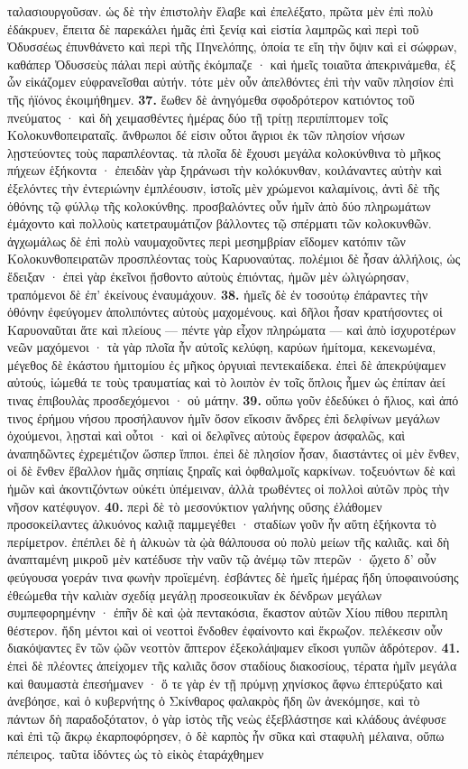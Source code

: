 \documentclass[a4paper, 11pt, oneside, polutonikogreek, german]{article}
\begin{document}
ταλασιουργοῦσαν. ὡς δὲ τὴν ἐπιστολὴν ἔλαβε καὶ ἐπελέξατο, πρῶτα μὲν ἐπὶ πολὺ ἐδάκρυεν, ἔπειτα δὲ παρεκάλει ἡμᾶς ἐπὶ ξενίᾳ καὶ εἱστία λαμπρῶς καὶ περὶ τοῦ Ὀδυσσέως ἐπυνθάνετο καὶ περὶ τῆς Πηνελόπης, ὁποία τε εἴη τὴν ὄψιν καὶ εἰ σώφρων, καθάπερ Ὀδυσσεὺς πάλαι περὶ αὐτῆς ἐκόμπαζε · καὶ ἡμεῖς τοιαῦτα ἀπεκρινάμεθα, ἐξ ὧν εἰκάζομεν εὐφρανεῖσθαι αὐτήν. τότε μὲν οὖν ἀπελθόντες ἐπὶ τὴν ναῦν πλησίον ἐπὶ τῆς ἠϊόνος ἐκοιμήθημεν. \textbf{37.} ἕωθεν δὲ ἀνηγόμεθα σφοδρότερον κατιόντος τοῦ πνεύματος · καὶ δὴ χειμασθέντες ἡμέρας δύο τῇ τρίτῃ περιπίπτομεν τοῖς Κολοκυνθοπειραταῖς. ἄνθρωποι δέ εἰσιν οὗτοι ἄγριοι ἐκ τῶν πλησίον νήσων λῃστεύοντες τοὺς παραπλέοντας. τὰ πλοῖα δὲ ἔχουσι μεγάλα κολοκύνθινα τὸ μῆκος πήχεων ἑξήκοντα · ἐπειδὰν γὰρ ξηράνωσι τὴν κολόκυνθαν, κοιλάναντες αὐτὴν καὶ ἐξελόντες τὴν ἐντεριώνην ἐμπλέουσιν, ἱστοῖς μὲν χρώμενοι καλαμίνοις, ἀντὶ δὲ τῆς ὀθόνης τῷ φύλλῳ τῆς κολοκύνθης. προσβαλόντες οὖν ἡμῖν ἀπὸ δύο πληρωμάτων ἐμάχοντο καὶ πολλοὺς κατετραυμάτιζον βάλλοντες τῷ σπέρματι τῶν κολοκυνθῶν. ἀγχωμάλως δὲ ἐπὶ πολὺ ναυμαχοῦντες περὶ μεσημβρίαν εἴδομεν κατόπιν τῶν Κολοκυνθοπειρατῶν προσπλέοντας τοὺς Καρυοναύτας. πολέμιοι δὲ ἦσαν ἀλλήλοις, ὡς ἔδειξαν · ἐπεὶ γὰρ ἐκεῖνοι ᾔσθοντο αὐτοὺς ἐπιόντας, ἡμῶν μὲν ὠλιγώρησαν, τραπόμενοι δὲ ἐπ' ἐκείνους ἐναυμάχουν. \textbf{38.} ἡμεῖς δὲ ἐν τοσούτῳ ἐπάραντες τὴν ὀθόνην ἐφεύγομεν ἀπολιπόντες αὐτοὺς μαχομένους. καὶ δῆλοι ἦσαν κρατήσοντες οἱ Καρυοναῦται ἅτε καὶ πλείους --- πέντε γὰρ εἶχον πληρώματα --- καὶ ἀπὸ ἰσχυροτέρων νεῶν μαχόμενοι · τὰ γὰρ πλοῖα ἦν αὐτοῖς κελύφη, καρύων ἡμίτομα, κεκενωμένα, μέγεθος δὲ ἑκάστου ἡμιτομίου ἐς μῆκος ὀργυιαὶ πεντεκαίδεκα. ἐπεὶ δὲ ἀπεκρύψαμεν αὐτούς, ἰώμεθά τε τοὺς τραυματίας καὶ τὸ λοιπὸν ἐν τοῖς ὅπλοις ἦμεν ὡς ἐπίπαν ἀεί τινας ἐπιβουλὰς προσδεχόμενοι · οὐ μάτην. \textbf{39.} οὔπω γοῦν ἐδεδύκει ὁ ἥλιος, καὶ ἀπό τινος ἐρήμου νήσου προσήλαυνον ἡμῖν ὅσον εἴκοσιν ἄνδρες ἐπὶ δελφίνων μεγάλων ὀχούμενοι, λῃσταὶ καὶ οὗτοι · καὶ οἱ δελφῖνες αὐτοὺς ἔφερον ἀσφαλῶς, καὶ ἀναπηδῶντες ἐχρεμέτιζον ὥσπερ ἵπποι. ἐπεὶ δὲ πλησίον ἦσαν, διαστάντες οἱ μὲν ἔνθεν, οἱ δὲ ἔνθεν ἔβαλλον ἡμᾶς σηπίαις ξηραῖς καὶ ὀφθαλμοῖς καρκίνων. τοξευόντων δὲ καὶ ἡμῶν καὶ ἀκοντιζόντων οὐκέτι ὑπέμειναν, ἀλλὰ τρωθέντες οἱ πολλοὶ αὐτῶν πρὸς τὴν νῆσον κατέφυγον. \textbf{40.} περὶ δὲ τὸ μεσονύκτιον γαλήνης οὔσης ἐλάθομεν προσοκείλαντες ἀλκυόνος καλιᾷ παμμεγέθει · σταδίων γοῦν ἦν αὕτη ἑξήκοντα τὸ περίμετρον. ἐπέπλει δὲ ἡ ἀλκυὼν τὰ ᾠὰ θάλπουσα οὐ πολὺ μείων τῆς καλιᾶς. καὶ δὴ ἀναπταμένη μικροῦ μὲν κατέδυσε τὴν ναῦν τῷ ἀνέμῳ τῶν πτερῶν · ᾤχετο δ' οὖν φεύγουσα γοεράν τινα φωνὴν προϊεμένη. ἐσβάντες δὲ ἡμεῖς ἡμέρας ἤδη ὑποφαινούσης ἐθεώμεθα τὴν καλιὰν σχεδίᾳ μεγάλῃ προσεοικυῖαν ἐκ δένδρων μεγάλων συμπεφορημένην · ἐπῆν δὲ καὶ ᾠὰ πεντακόσια, ἕκαστον αὐτῶν Χίου πίθου περιπλη θέστερον. ἤδη μέντοι καὶ οἱ νεοττοὶ ἔνδοθεν ἐφαίνοντο καὶ ἔκρωζον. πελέκεσιν οὖν διακόψαντες ἓν τῶν ᾠῶν νεοττὸν ἄπτερον ἐξεκολάψαμεν εἴκοσι γυπῶν ἁδρότερον. \textbf{41.} ἐπεὶ δὲ πλέοντες ἀπείχομεν τῆς καλιᾶς ὅσον σταδίους διακοσίους, τέρατα ἡμῖν μεγάλα καὶ θαυμαστὰ ἐπεσήμανεν · ὅ τε γὰρ ἐν τῇ πρύμνῃ χηνίσκος ἄφνω ἐπτερύξατο καὶ ἀνεβόησε, καὶ ὁ κυβερνήτης ὁ Σκίνθαρος φαλακρὸς ἤδη ὢν ἀνεκόμησε, καὶ τὸ πάντων δὴ παραδοξότατον, ὁ γὰρ ἱστὸς τῆς νεὼς ἐξεβλάστησε καὶ κλάδους ἀνέφυσε καὶ ἐπὶ τῷ ἄκρῳ ἐκαρποφόρησεν, ὁ δὲ καρπὸς ἦν σῦκα καὶ σταφυλὴ μέλαινα, οὔπω πέπειρος. ταῦτα ἰδόντες ὡς τὸ εἰκὸς ἐταράχθημεν 
\end{document}
